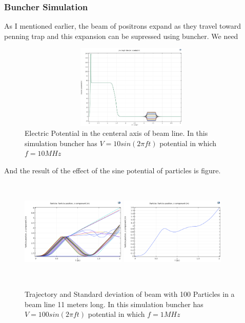 \documentclass[12pt,a4paper]{article}
\begin{document}
\subsubsection{Buncher Simulation}
As I mentioned earlier, the beam of positrons expand as they travel toward penning trap and this expansion can be supressed using buncher. We need

\begin{figure}[h]
\centering
\includegraphics[width=110mm, height=40mm]{potential_buncher}
\caption{Electric Potential in the centeral axis of beam line. In this simulation buncher has $ V = 10 sin(2 \pi f t) $ potential in which $ f=10 MHz $}
\end{figure}

And the result of the effect of the sine potential of particles is figure.

\begin{figure}[h]
\centering
\includegraphics[width=50mm, height=50mm]{buncer-in-100V-1Mhz-50Particles}
\includegraphics[width=50mm, height=50mm]{buncer-std-100V-1Mhz-50Particles}
\caption{Trajectory and Standard deviation of beam with 100 Particles in a beam line 11 meters long. In this simulation buncher has $ V = 100 sin(2 \pi f t) $ potential in which $ f=1 MHz $}
\end{figure}
\end{document}
